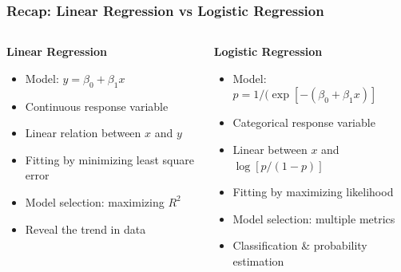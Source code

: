\documentclass[10pt,aspectratio=169]{beamer}
\begin{document}
      \begin{frame}
        \frametitle{Recap: Linear Regression vs Logistic Regression}
        \begin{columns}[T]
          \begin{column}{0.5\textwidth}
            \begin{minipage}[t][\textwidth][t]{1.0\linewidth}
              \textbf{Linear Regression}
              \begin{itemize}
                \vfill \item Model: $y = \beta_{0} + \beta_{1}x$
              
                \vfill \item Continuous response variable

              
                \vfill \item Linear relation between $x$ and $y$
              
                \vfill \item Fitting by minimizing least square error
              
                \vfill \item Model selection: maximizing $R^{2}$

              
                \vfill \item Reveal the trend in data
              \end{itemize}
            \end{minipage}
          \end{column}

          \begin{column}{0.5\textwidth}
            \begin{minipage}[t][\textwidth][t]{1.0\linewidth}
              \textbf{Logistic Regression}

              \begin{itemize}
                \vfill \item Model:
                $p =1 / (\exp[-(\beta_{0} + \beta_{1}x)]$

                \vfill \item Categorical response variable

                \vfill \item Linear between $x$ and $\log[p/(1-p)]$

                \vfill \item Fitting by maximizing likelihood

              
                \vfill \item Model selection: multiple metrics

              
                \vfill \item Classification \& probability estimation
              
              \end{itemize}
            \end{minipage}
          \end{column}
        \end{columns}
      \end{frame}
\end{document}
